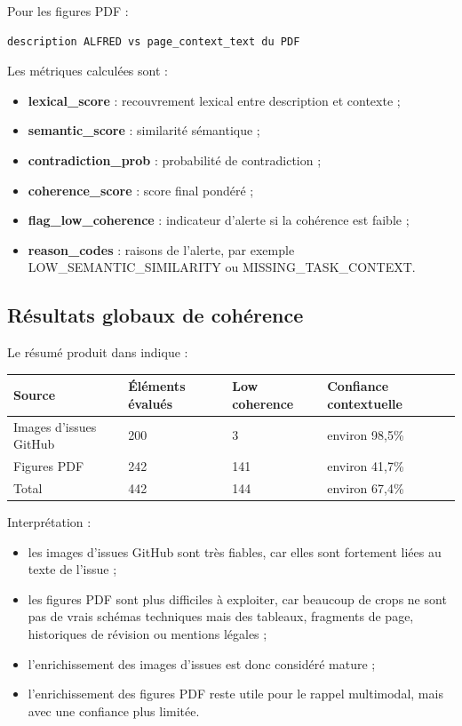 \documentclass[11pt,a4paper]{article}
\begin{document}
Pour les figures PDF :

\begin{verbatim}
description ALFRED vs page_context_text du PDF
\end{verbatim}

Les métriques calculées sont :

\begin{itemize}
  \item \textbf{lexical\_score} : recouvrement lexical entre description et contexte ;
  \item \textbf{semantic\_score} : similarité sémantique ;
  \item \textbf{contradiction\_prob} : probabilité de contradiction ;
  \item \textbf{coherence\_score} : score final pondéré ;
  \item \textbf{flag\_low\_coherence} : indicateur d'alerte si la cohérence est faible ;
  \item \textbf{reason\_codes} : raisons de l'alerte, par exemple LOW\_SEMANTIC\_SIMILARITY ou MISSING\_TASK\_CONTEXT.
\end{itemize}

\subsection{Résultats globaux de cohérence}

Le résumé produit dans  indique :

\begin{longtable}{p{5cm}p{3cm}p{3cm}p{4cm}}
\toprule
\textbf{Source} & \textbf{Éléments évalués} & \textbf{Low coherence} & \textbf{Confiance contextuelle} \\
\midrule
Images d'issues GitHub & 200 & 3 & environ 98,5\% \\
Figures PDF & 242 & 141 & environ 41,7\% \\
\midrule
Total & 442 & 144 & environ 67,4\% \\
\bottomrule
\end{longtable}

Interprétation :

\begin{itemize}
  \item les images d'issues GitHub sont très fiables, car elles sont fortement liées au texte de l'issue ;
  \item les figures PDF sont plus difficiles à exploiter, car beaucoup de crops ne sont pas de vrais schémas techniques mais des tableaux, fragments de page, historiques de révision ou mentions légales ;
  \item l'enrichissement des images d'issues est donc considéré mature ;
  \item l'enrichissement des figures PDF reste utile pour le rappel multimodal, mais avec une confiance plus limitée.
\end{itemize}
\end{document}
